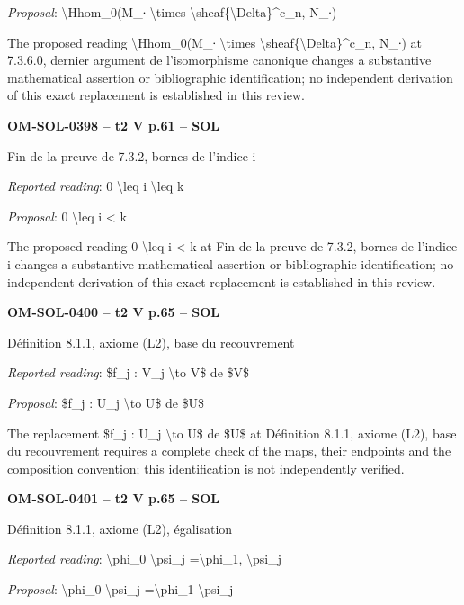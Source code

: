 \emph{Proposal}: \textbackslash{}Hhom\_0(M\_∙ \textbackslash{}times \textbackslash{}sheaf\{\textbackslash{}Delta\}\textasciicircum{}c\_n, N\_∙)\par
The proposed reading \textbackslash{}Hhom\_0(M\_∙ \textbackslash{}times \textbackslash{}sheaf\{\textbackslash{}Delta\}\textasciicircum{}c\_n, N\_∙) at 7.3.6.0, dernier argument de l'isomorphisme canonique changes a substantive mathematical assertion or bibliographic identification; no independent derivation of this exact replacement is established in this review.\par
\par\noindent\textbf{OM-SOL-0398 -- t2 V p.61 -- SOL}\par
Fin de la preuve de 7.3.2, bornes de l'indice i\par
\emph{Reported reading}: 0 \textbackslash{}leq i \textbackslash{}leq k\par
\emph{Proposal}: 0 \textbackslash{}leq i < k\par
The proposed reading 0 \textbackslash{}leq i < k at Fin de la preuve de 7.3.2, bornes de l'indice i changes a substantive mathematical assertion or bibliographic identification; no independent derivation of this exact replacement is established in this review.\par
\par\noindent\textbf{OM-SOL-0400 -- t2 V p.65 -- SOL}\par
Définition 8.1.1, axiome (L2), base du recouvrement\par
\emph{Reported reading}: \$f\_j : V\_j \textbackslash{}to V\$ de \$V\$\par
\emph{Proposal}: \$f\_j : U\_j \textbackslash{}to U\$ de \$U\$\par
The replacement \$f\_j : U\_j \textbackslash{}to U\$ de \$U\$ at Définition 8.1.1, axiome (L2), base du recouvrement requires a complete check of the maps, their endpoints and the composition convention; this identification is not independently verified.\par
\par\noindent\textbf{OM-SOL-0401 -- t2 V p.65 -- SOL}\par
Définition 8.1.1, axiome (L2), égalisation\par
\emph{Reported reading}: \textbackslash{}phi\_0 \textbackslash{}psi\_j =\allowbreak  \textbackslash{}phi\_1, \textbackslash{}psi\_j\par
\emph{Proposal}: \textbackslash{}phi\_0 \textbackslash{}psi\_j =\allowbreak  \textbackslash{}phi\_1 \textbackslash{}psi\_j\par
